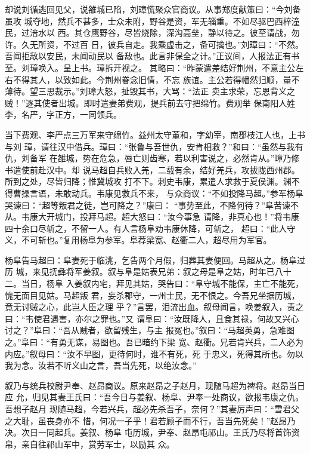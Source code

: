 却说刘循逃回见父，说雒城已陷，刘璋慌聚众官商议。从事郑度献策曰：“今刘备虽攻
城夺地，然兵不甚多，士众未附，野谷是资，军无辎重。不如尽驱巴西梓潼民，过涪水以
西。其仓鹰野谷，尽皆烧除，深沟高垒，静以待之。彼至请战，勿许。久无所资，不过百
日，彼兵自走。我乘虚击之，备可擒也。”刘璋曰：“不然。吾闻拒敌以安民，未闻动民以
备敌也。此言非保全之计。”正议间，人报法正有书至。刘璋唤入。呈上书。璋拆开视之。
其略曰：“昨蒙遣差结好荆州，不意主公左右不得其人，以致如此。今荆州眷念旧情，不忘
族谊。主公若得幡然归顺，量不薄待。望三思裁示。”刘璋大怒，扯毁其书，大骂：“法正
卖主求荣，忘恩背义之贼！”逐其使者出城。即时遣妻弟费观，提兵前去守把绵竹。费观举
保南阳人姓李，名严，字正方，一同领兵。

当下费观、李严点三万军来守绵竹。益州太守董和，字幼宰，南郡枝江人也，上书与刘
璋，请往汉中借兵。璋曰：“张鲁与吾世仇，安肯相救？”和曰：“虽然与我有仇，刘备军
在雒城，势在危急，唇亡则齿寒，若以利害说之，必然肯从。”璋乃修书遣使前赴汉中。却
说马超自兵败入羌，二载有余，结好羌兵，攻拔陇西州郡。所到之处，尽皆归降；惟冀城攻
打不下。刺史韦康，累遣人求救于夏侯渊。渊不得曹操言语，未敢动兵。韦康见救兵不来，
与众商议：“不如投降马超。”参军杨阜哭谏曰：“超等叛君之徒，岂可降之？”康曰：
“事势至此，不降何待？”阜苦谏不从。韦康大开城门，投拜马超。超大怒曰：“汝今事急
请降，非真心也！”将韦康四十余口尽斩之，不留一人。有人言杨阜劝韦康休降，可斩之，
超曰：“此人守义，不可斩也。”复用杨阜为参军。阜荐梁宽、赵衢二人，超尽用为军官。

杨阜告马超曰：阜妻死于临洮，乞告两个月假，归葬其妻便回。马超从之。杨阜过历
城，来见抚彝将军姜叙。叙与阜是姑表兄弟：叙之母是阜之姑，时年已八十二。当日，杨阜
入姜叙内宅，拜见其姑，哭告曰：“阜守城不能保，主亡不能死，愧无面目见姑。马超叛
君，妄杀郡守，一州士民，无不恨之。今吾兄坐据历城，竟无讨贼之心，此岂人臣之理
乎？”言罢，泪流出血。叙母闻言，唤姜叙入，责之曰：“韦使君遇害，亦尔之罪也。”又
谓阜曰：“汝既降人，且食其禄，何故又兴心讨之？”阜曰：“吾从贼者，欲留残生，与主
报冤也。”叙曰：“马超英勇，急难图之。”阜曰：“有勇无谋，易图也。吾已暗约下梁
宽、赵衢。兄若肯兴兵，二人必为内应。”叙母曰：“汝不早图，更待何时，谁不有死，死
于忠义，死得其所也。勿以我为念。汝若不听义山之言，吾当先死，以绝汝念。”

叙乃与统兵校尉尹奉、赵昂商议。原来赵昂之子赵月，现随马超为裨将。赵昂当日应
允，归见其妻王氏曰：“吾今日与姜叙、杨阜、尹奉一处商议，欲报韦康之仇。吾想子赵月
现随马超，今若兴兵，超必先杀吾子，奈何？”其妻厉声曰：“雪君父之大耻，虽丧身亦不
惜，何况一子乎！君若顾子而不行，吾当先死矣！”赵昂乃决。次日一同起兵。姜叙、杨阜
屯历城，尹奉、赵昂屯祁山。王氏乃尽将首饰资帛，亲自往祁山军中，赏劳军士，以励其
众。

